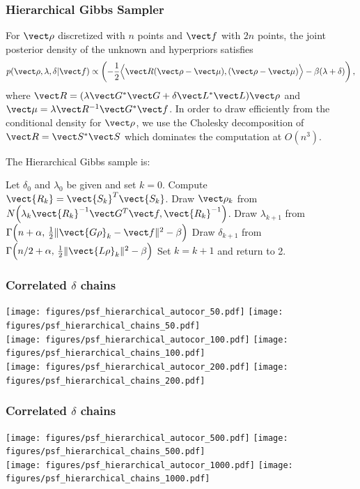 \documentclass[]{beamer}
\begin{document}
\begin{frame}[t]
  \frametitle{Hierarchical Gibbs Sampler}
  {\footnotesize
  For $\vect \rho$ discretized with $n$ points and $\vect f$ with $2n$ points, the joint posterior density of the unknown and hyperpriors satisfies
  $$
    p(\vect \rho,\lambda,\delta |\vect f) \propto \left(-\frac 12 \Big \langle \vect R (\vect \rho - \vect \mu) , (\vect \rho - \vect \mu)\Big\rangle -\beta(\lambda+\delta)\right),
  $$
  where $\vect R = (\lambda \vect G^* \vect G + \delta \vect L^* \vect L)\vect \rho$ and $\vect \mu = \lambda \vect R^{-1}\vect G^* \vect f$.
  In order to draw efficiently from the conditional density for $\vect \rho$, we use the Cholesky decomposition of $\vect R = \vect S^* \vect S$ which dominates the computation at $O(n^3)$.

  The \alert{Hierarchical Gibbs sample} is: 
  \begin{center}
  \begin{algorithmic}[1]
    \STATE Let $\delta_0$ and $\lambda_0$ be given and set $k=0$.
    \STATE Compute $\vect {R_k} = \vect{S_k}^T \vect{S_k}$. 
    \STATE Draw $\vect \rho_k$ from $N\Big( \lambda_k \vect{R_k}^{-1}\vect G^T\vect f, \vect{R_k}^{-1} \Big)$.
    \STATE Draw $\lambda_{k+1}$ from $\Gamma \Big(n+\alpha,\,\frac12\|\vect{G\rho}_k - \vect f\|^2 - \beta \Big)$
    \alert{\STATE Draw $\delta_{k+1}$ from $\Gamma \Big(n/2+\alpha,\,\frac12\|\vect{L\rho}_k\|^2 - \beta \Big)$}
    \STATE Set $k=k+1$ and return to 2.
  \end{algorithmic}
  \end{center}
  }
\end{frame}

\begin{frame}[t]
  \frametitle{Correlated $\delta$ chains}
  \vspace{-1.2em}
  \begin{center}
    \texttt{[image: figures/psf\_hierarchical\_autocor\_50.pdf]}  \texttt{[image: figures/psf\_hierarchical\_chains\_50.pdf]}\\
    \texttt{[image: figures/psf\_hierarchical\_autocor\_100.pdf]} \texttt{[image: figures/psf\_hierarchical\_chains\_100.pdf]}\\
    \texttt{[image: figures/psf\_hierarchical\_autocor\_200.pdf]} \texttt{[image: figures/psf\_hierarchical\_chains\_200.pdf]}\\
  \end{center}
\end{frame}
\begin{frame}[t]
  \frametitle{Correlated $\delta$ chains}
  \begin{center}
    \texttt{[image: figures/psf\_hierarchical\_autocor\_500.pdf]} \texttt{[image: figures/psf\_hierarchical\_chains\_500.pdf]}\\ 
    \texttt{[image: figures/psf\_hierarchical\_autocor\_1000.pdf]} \texttt{[image: figures/psf\_hierarchical\_chains\_1000.pdf]}\\ 
  \end{center}
\end{frame}
\end{document}
